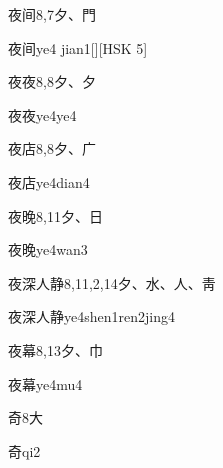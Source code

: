 \begin{Entry}{夜间}{8,7}{⼣、⾨}
  \begin{Phonetics}{夜间}{ye4 jian1}[][HSK 5]
  \end{Phonetics}
\end{Entry}

\begin{Entry}{夜夜}{8,8}{⼣、⼣}
  \begin{Phonetics}{夜夜}{ye4ye4}
  \end{Phonetics}
\end{Entry}

\begin{Entry}{夜店}{8,8}{⼣、⼴}
  \begin{Phonetics}{夜店}{ye4dian4}
  \end{Phonetics}
\end{Entry}

\begin{Entry}{夜晚}{8,11}{⼣、⽇}
  \begin{Phonetics}{夜晚}{ye4wan3}
  \end{Phonetics}
\end{Entry}

\begin{Entry}{夜深人静}{8,11,2,14}{⼣、⽔、⼈、⾭}
  \begin{Phonetics}{夜深人静}{ye4shen1ren2jing4}
  \end{Phonetics}
\end{Entry}

\begin{Entry}{夜幕}{8,13}{⼣、⼱}
  \begin{Phonetics}{夜幕}{ye4mu4}
  \end{Phonetics}
\end{Entry}

\begin{Entry}{奇}{8}{⼤}
  \begin{Phonetics}{奇}{qi2}
  \end{Phonetics}
\end{Entry}

